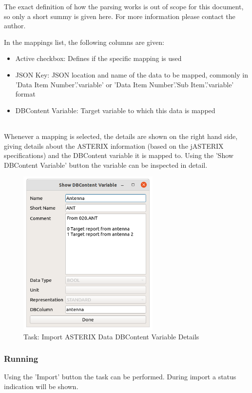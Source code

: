The exact definition of how the parsing works is out of scope for this document, so only a short summy is given here. For more information please contact the author.

In the mappings list, the following columns are given:

\begin{itemize}
\item Active checkbox: Defines if the specific mapping is used
\item JSON Key: JSON location and name of the data to be mapped, commonly in 'Data Item Number'.'variable' or 'Data Item Number'.'Sub Item'.'variable' format
\item DBContent Variable: Target variable to which this data is mapped
\end{itemize}
\ \\

Whenever a mapping is selected, the details are shown on the right hand side, giving details about the ASTERIX information (based on the jASTERIX specifications) and the DBContent variable it is mapped to. Using the 'Show DBContent Variable' button the variable can be inspected in detail.

\begin{figure}[H]
  \center
    \includegraphics[width=7cm]{figures/asterix_import_data_dbcont_var_details.png}
  \caption{Task: Import ASTERIX Data DBContent Variable Details}
\end{figure}

\subsubsection{Running}

Using the 'Import' button the task can be performed. During import a status indication will be shown. \\

